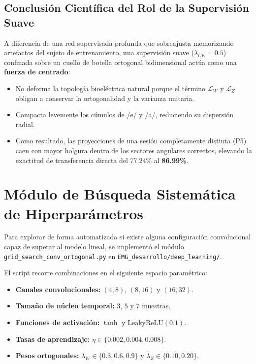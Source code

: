 \documentclass[11pt,a4paper]{article}
\begin{document}
\subsection{Conclusión Científica del Rol de la Supervisión Suave}
\label{subsec:conclusion_supervision}

A diferencia de una red supervisada profunda que sobreajusta memorizando artefactos del sujeto de entrenamiento, una supervisión suave ($\lambda_{CE} = 0.5$) confinada sobre un cuello de botella ortogonal bidimensional actúa como una \textbf{fuerza de centrado}:
\begin{itemize}
    \item No deforma la topología bioeléctrica natural porque el término $\mathcal{L}_W$ y $\mathcal{L}_Z$ obligan a conservar la ortogonalidad y la varianza unitaria.
    \item Compacta levemente los cúmulos de /e/ y /a/, reduciendo su dispersión radial.
    \item Como resultado, las proyecciones de una sesión completamente distinta (P5) caen con mayor holgura dentro de los sectores angulares correctos, elevando la exactitud de transferencia directa del $77.24\%$ al \textbf{86.99\%}.
\end{itemize}

\section{Módulo de Búsqueda Sistemática de Hiperparámetros}
\label{sec:grid_search}

Para explorar de forma automatizada si existe alguna configuración convolucional capaz de superar al modelo lineal, se implementó el módulo \texttt{grid\_search\_conv\_ortogonal.py} en \texttt{EMG\_desarrollo/deep\_learning/}.

El script recorre combinaciones en el siguiente espacio paramétrico:
\begin{itemize}
    \item \textbf{Canales convolucionales:} $(4, 8)$, $(8, 16)$ y $(16, 32)$.
    \item \textbf{Tamaño de núcleo temporal:} $3$, $5$ y $7$ muestras.
    \item \textbf{Funciones de activación:} $\tanh$ y $\text{LeakyReLU}(0.1)$.
    \item \textbf{Tasas de aprendizaje:} $\eta \in \{0.002, 0.004, 0.008\}$.
    \item \textbf{Pesos ortogonales:} $\lambda_W \in \{0.3, 0.6, 0.9\}$ y $\lambda_Z \in \{0.10, 0.20\}$.
\end{itemize}
\end{document}
